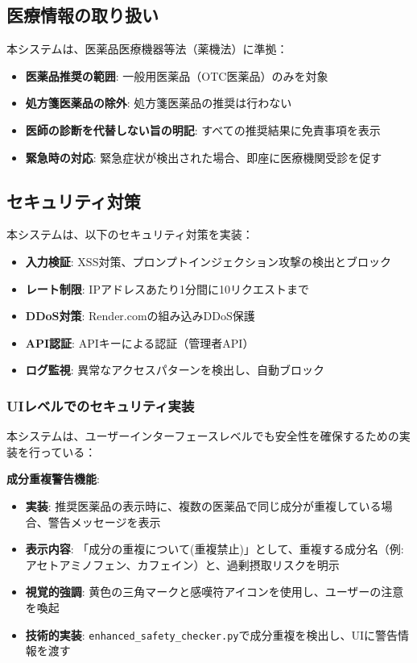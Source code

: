 \documentclass[a4paper,11pt,ja=standard,xelatex]{bxjsarticle}
\theoremstyle{definition}
\begin{document}
\subsection{医療情報の取り扱い}

本システムは、医薬品医療機器等法（薬機法）に準拠：
\begin{itemize}
\item \textbf{医薬品推奨の範囲}: 一般用医薬品（OTC医薬品）のみを対象
\item \textbf{処方箋医薬品の除外}: 処方箋医薬品の推奨は行わない
\item \textbf{医師の診断を代替しない旨の明記}: すべての推奨結果に免責事項を表示
\item \textbf{緊急時の対応}: 緊急症状が検出された場合、即座に医療機関受診を促す
\end{itemize}

\subsection{セキュリティ対策}

本システムは、以下のセキュリティ対策を実装：
\begin{itemize}
\item \textbf{入力検証}: XSS対策、プロンプトインジェクション攻撃の検出とブロック
\item \textbf{レート制限}: IPアドレスあたり1分間に10リクエストまで
\item \textbf{DDoS対策}: Render.comの組み込みDDoS保護
\item \textbf{API認証}: APIキーによる認証（管理者API）
\item \textbf{ログ監視}: 異常なアクセスパターンを検出し、自動ブロック
\end{itemize}

\subsubsection{UIレベルでのセキュリティ実装}

本システムは、ユーザーインターフェースレベルでも安全性を確保するための実装を行っている：

\textbf{成分重複警告機能}:
\begin{itemize}
\item \textbf{実装}: 推奨医薬品の表示時に、複数の医薬品で同じ成分が重複している場合、警告メッセージを表示
\item \textbf{表示内容}: 「成分の重複について(重複禁止)」として、重複する成分名（例: アセトアミノフェン、カフェイン）と、過剰摂取リスクを明示
\item \textbf{視覚的強調}: 黄色の三角マークと感嘆符アイコンを使用し、ユーザーの注意を喚起
\item \textbf{技術的実装}: \texttt{enhanced\_safety\_checker.py}で成分重複を検出し、UIに警告情報を渡す
\end{itemize}
\end{document}
